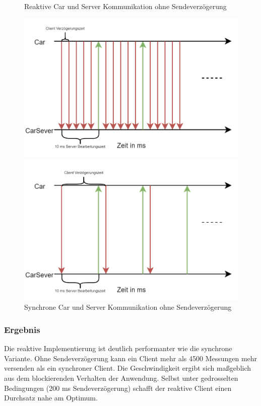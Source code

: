 \begin{center}
\begin{figure}[H]
\caption{Reaktive Car und Server Kommunikation ohne Sendeverzögerung}
\includegraphics[scale=.5]{./media/without_delay_reactive.png}

\caption{Synchrone Car und Server Kommunikation ohne Sendeverzögerung}
\includegraphics[scale=.5]{./media/without_delay_synchron.png}
\end{figure}
\end{center}

\subsubsection{Ergebnis}
Die reaktive Implementierung ist deutlich performanter wie die synchrone Variante. Ohne Sendeverzögerung kann ein Client mehr als 4500 Messungen mehr versenden als ein synchroner Client. Die Geschwindigkeit ergibt sich maßgeblich aus dem blockierenden Verhalten der Anwendung. Selbst unter gedrosselten Bedingungen (200 ms Sendeverzögerung) schafft der reaktive Client einen Durchsatz nahe am Optimum.